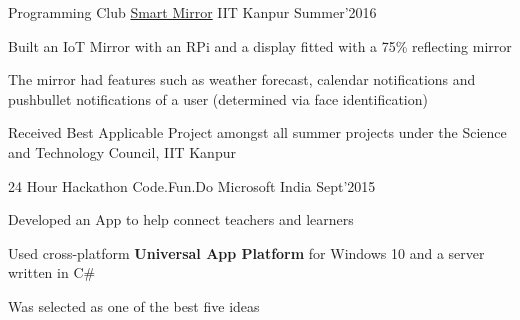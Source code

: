 \begin{cventries}
  \cventry
  {Programming Club}
  {\href{http://pclub.in/project/2016/07/06/smartmirror.html}{Smart Mirror}}
  {IIT Kanpur}
  {Summer'2016}
  {
    \begin{cvitems}
    \item Built an IoT Mirror with an RPi and a display fitted with a 75\%
      reflecting mirror
    \item The mirror had features such as weather forecast, calendar
      notifications and pushbullet notifications of a user (determined via face
      identification)
    \item Received Best Applicable Project amongst all summer projects under
      the Science and Technology Council, IIT Kanpur
    \end{cvitems}
  }

  \cventry
  {24 Hour Hackathon}
  {Code.Fun.Do}
  {Microsoft India}
  {Sept'2015}
  {
    \begin{cvitems}
    \item Developed an App to help connect teachers and learners
    \item Used cross-platform \textbf{Universal App Platform} for Windows 10
      and a server written in C\#
    \item Was selected as one of the best five ideas
    \end{cvitems}
  }

\end{cventries}

